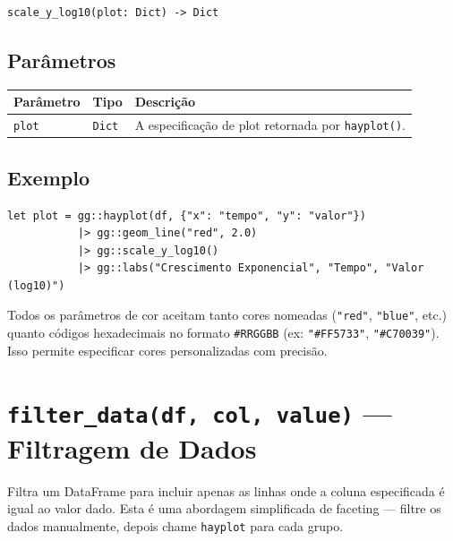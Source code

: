 \documentclass[12pt, a4paper, oneside]{book}
\newcommand{\code}[1]{\texttt{#1}}
\begin{document}
\begin{lstlisting}[style=inline]
scale_y_log10(plot: Dict) -> Dict
\end{lstlisting}

\subsection*{Parâmetros}

\begin{tabularx}{\textwidth}{@{}lL{2.5cm}X@{}}
  \toprule
  \textbf{Parâmetro} & \textbf{Tipo} & \textbf{Descrição} \\
  \midrule
  \code{plot} & \code{Dict} & A especificação de plot retornada por \code{hayplot()}. \\
  \bottomrule
\end{tabularx}

\subsection*{Exemplo}

\begin{lstlisting}[caption={Eixo Y em escala logarítmica}]
let plot = gg::hayplot(df, {"x": "tempo", "y": "valor"})
           |> gg::geom_line("red", 2.0)
           |> gg::scale_y_log10()
           |> gg::labs("Crescimento Exponencial", "Tempo", "Valor (log10)")
\end{lstlisting}

\begin{tipbox}[title={\textbf{Dica:} Cores hexadecimais}]
  Todos os parâmetros de cor aceitam tanto cores nomeadas (\code{"red"}, \code{"blue"}, etc.)
  quanto códigos hexadecimais no formato \code{\#RRGGBB} (ex: \code{"\#FF5733"}, \code{"\#C70039"}).
  Isso permite especificar cores personalizadas com precisão.
\end{tipbox}

\section{\texttt{filter\_data(df, col, value)} --- Filtragem de Dados}

Filtra um DataFrame para incluir apenas as linhas onde a coluna especificada é igual ao valor dado.
Esta é uma abordagem simplificada de faceting — filtre os dados manualmente, depois chame \code{hayplot} para cada grupo.
\end{document}
